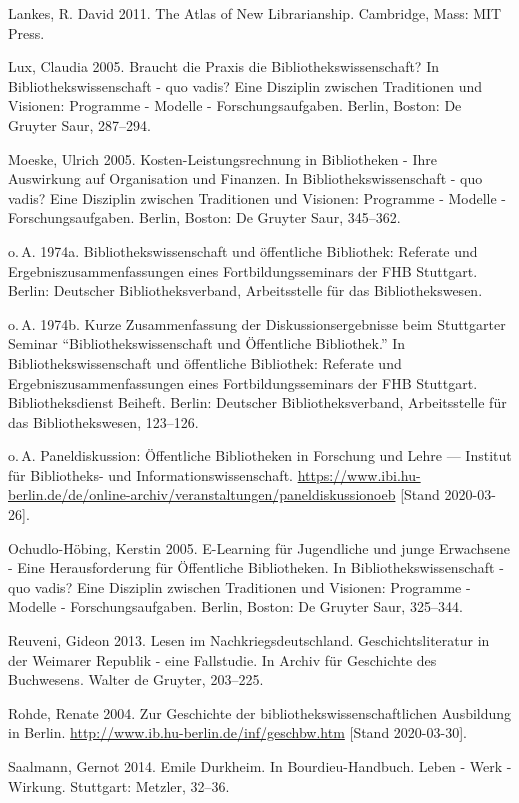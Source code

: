 \documentclass[a4paper,
fontsize=11pt,
oneside,
numbers=noperiodatend,
parskip=half-,
bibliography=totoc,
final
]{scrartcl}
\begin{document}
Lankes, R. David 2011. The Atlas of New Librarianship. Cambridge, Mass:
MIT Press.

Lux, Claudia 2005. Braucht die Praxis die Bibliothekswissenschaft? In
Bibliothekswissenschaft - quo vadis? Eine Disziplin zwischen Traditionen
und Visionen: Programme - Modelle - Forschungsaufgaben. Berlin, Boston:
De Gruyter Saur, 287--294.

Moeske, Ulrich 2005. Kosten-Leistungsrechnung in Bibliotheken - Ihre
Auswirkung auf Organisation und Finanzen. In Bibliothekswissenschaft -
quo vadis? Eine Disziplin zwischen Traditionen und Visionen: Programme -
Modelle - Forschungsaufgaben. Berlin, Boston: De Gruyter Saur, 345--362.

o.\,A. 1974a. Bibliothekswissenschaft und öffentliche Bibliothek:
Referate und Ergebniszusammenfassungen eines Fortbildungsseminars der
FHB Stuttgart. Berlin: Deutscher Bibliotheksverband, Arbeitsstelle für
das Bibliothekswesen.

o.\,A. 1974b. Kurze Zusammenfassung der Diskussionsergebnisse beim
Stuttgarter Seminar \enquote{Bibliothekswissenschaft und Öffentliche
Bibliothek.} In Bibliothekswissenschaft und öffentliche Bibliothek:
Referate und Ergebniszusammenfassungen eines Fortbildungsseminars der
FHB \linebreak Stuttgart. Bibliotheksdienst Beiheft. Berlin: Deutscher
Bibliotheksverband, Arbeitsstelle für das Bibliothekswesen, 123--126.

o.\,A. Paneldiskussion: Öffentliche Bibliotheken in Forschung und Lehre
--- Institut für Biblio\-theks- und Informations­wissen­schaft.
\url{https://www.ibi.hu-berlin.de/de/online-archiv/veranstaltungen/paneldiskussionoeb}
{[}Stand 2020-03-26{]}.

Ochudlo-Höbing, Kerstin 2005. E-Learning für Jugendliche und junge
Erwachsene - Eine Herausforderung für Öffentliche Bibliotheken. In
Bibliothekswissenschaft - quo vadis? Eine Disziplin zwischen Traditionen
und Visionen: Programme - Modelle - Forschungsaufgaben. Berlin, Boston:
De Gruyter Saur, 325--344.

Reuveni, Gideon 2013. Lesen im Nachkriegsdeutschland.
Geschichtsliteratur in der Weimarer Republik - eine Fallstudie. In
Archiv für Geschichte des Buchwesens. Walter de Gruyter, 203--225.

Rohde, Renate 2004. Zur Geschichte der bibliothekswissenschaftlichen
Ausbildung in Berlin. \url{http://www.ib.hu-berlin.de/inf/geschbw.htm}
{[}Stand 2020-03-30{]}.

Saalmann, Gernot 2014. Emile Durkheim. In Bourdieu-Handbuch. Leben -
Werk - Wirkung. Stuttgart: Metzler, 32--36.
\end{document}
